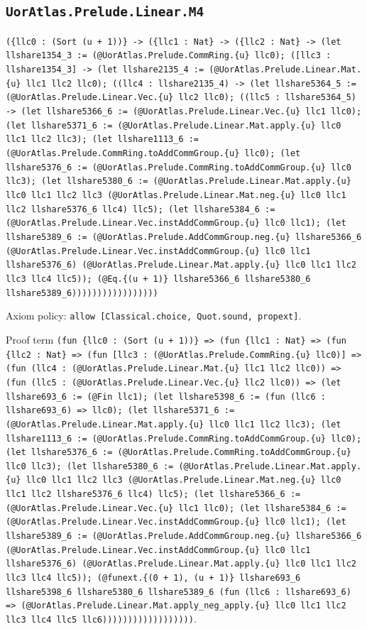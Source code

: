 \documentclass[11pt]{article}
\begin{document}
\subsection*{\texttt{UorAtlas.Prelude.Linear.M4}}
\noindent\texttt{(\{llc0 : (Sort (u + 1))\} -> (\{llc1 : Nat\} -> (\{llc2 : Nat\} -> (let llshare1354\_3 := (@UorAtlas.Prelude.CommRing.\{u\} llc0); ([llc3 : llshare1354\_3] -> (let llshare2135\_4 := (@UorAtlas.Prelude.Linear.Mat.\{u\} llc1 llc2 llc0); ((llc4 : llshare2135\_4) -> (let llshare5364\_5 := (@UorAtlas.Prelude.Linear.Vec.\{u\} llc2 llc0); ((llc5 : llshare5364\_5) -> (let llshare5366\_6 := (@UorAtlas.Prelude.Linear.Vec.\{u\} llc1 llc0); (let llshare5371\_6 := (@UorAtlas.Prelude.Linear.Mat.apply.\{u\} llc0 llc1 llc2 llc3); (let llshare1113\_6 := (@UorAtlas.Prelude.CommRing.toAddCommGroup.\{u\} llc0); (let llshare5376\_6 := (@UorAtlas.Prelude.CommRing.toAddCommGroup.\{u\} llc0 llc3); (let llshare5380\_6 := (@UorAtlas.Prelude.Linear.Mat.apply.\{u\} llc0 llc1 llc2 llc3 (@UorAtlas.Prelude.Linear.Mat.neg.\{u\} llc0 llc1 llc2 llshare5376\_6 llc4) llc5); (let llshare5384\_6 := (@UorAtlas.Prelude.Linear.Vec.instAddCommGroup.\{u\} llc0 llc1); (let llshare5389\_6 := (@UorAtlas.Prelude.AddCommGroup.neg.\{u\} llshare5366\_6 (@UorAtlas.Prelude.Linear.Vec.instAddCommGroup.\{u\} llc0 llc1 llshare5376\_6) (@UorAtlas.Prelude.Linear.Mat.apply.\{u\} llc0 llc1 llc2 llc3 llc4 llc5)); (@Eq.\{(u + 1)\} llshare5366\_6 llshare5380\_6 llshare5389\_6)))))))))))))))))}\par
\noindent Axiom policy: \texttt{allow [Classical.choice, Quot.sound, propext]}.\par
\noindent Proof term \texttt{(fun \{llc0 : (Sort (u + 1))\} => (fun \{llc1 : Nat\} => (fun \{llc2 : Nat\} => (fun [llc3 : (@UorAtlas.Prelude.CommRing.\{u\} llc0)] => (fun (llc4 : (@UorAtlas.Prelude.Linear.Mat.\{u\} llc1 llc2 llc0)) => (fun (llc5 : (@UorAtlas.Prelude.Linear.Vec.\{u\} llc2 llc0)) => (let llshare693\_6 := (@Fin llc1); (let llshare5398\_6 := (fun (llc6 : llshare693\_6) => llc0); (let llshare5371\_6 := (@UorAtlas.Prelude.Linear.Mat.apply.\{u\} llc0 llc1 llc2 llc3); (let llshare1113\_6 := (@UorAtlas.Prelude.CommRing.toAddCommGroup.\{u\} llc0); (let llshare5376\_6 := (@UorAtlas.Prelude.CommRing.toAddCommGroup.\{u\} llc0 llc3); (let llshare5380\_6 := (@UorAtlas.Prelude.Linear.Mat.apply.\{u\} llc0 llc1 llc2 llc3 (@UorAtlas.Prelude.Linear.Mat.neg.\{u\} llc0 llc1 llc2 llshare5376\_6 llc4) llc5); (let llshare5366\_6 := (@UorAtlas.Prelude.Linear.Vec.\{u\} llc1 llc0); (let llshare5384\_6 := (@UorAtlas.Prelude.Linear.Vec.instAddCommGroup.\{u\} llc0 llc1); (let llshare5389\_6 := (@UorAtlas.Prelude.AddCommGroup.neg.\{u\} llshare5366\_6 (@UorAtlas.Prelude.Linear.Vec.instAddCommGroup.\{u\} llc0 llc1 llshare5376\_6) (@UorAtlas.Prelude.Linear.Mat.apply.\{u\} llc0 llc1 llc2 llc3 llc4 llc5)); (@funext.\{(0 + 1), (u + 1)\} llshare693\_6 llshare5398\_6 llshare5380\_6 llshare5389\_6 (fun (llc6 : llshare693\_6) => (@UorAtlas.Prelude.Linear.Mat.apply\_neg\_apply.\{u\} llc0 llc1 llc2 llc3 llc4 llc5 llc6))))))))))))))))))}.\par
\end{document}
